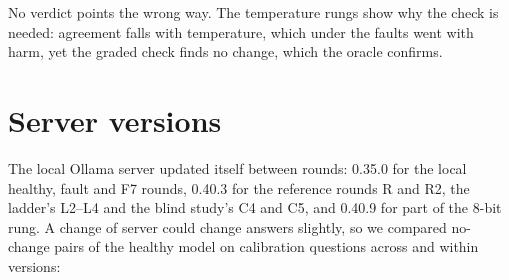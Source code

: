 \documentclass{article}
\begin{document}
\begin{center}\small
\setlength{\tabcolsep}{3pt}
\end{center}

\noindent No verdict points the wrong way. The temperature rungs show why the check
is needed: agreement falls with temperature, which under the faults went with harm,
yet the graded check finds no change, which the oracle confirms.

\section{Server versions}
\label{app:server}

The local Ollama server updated itself between rounds: 0.35.0 for the local
healthy, fault and F7 rounds, 0.40.3 for the reference rounds R and R2, the ladder's
L2--L4 and the blind study's C4 and C5, and 0.40.9 for part of the 8-bit rung. A
change of server could change answers slightly, so we compared no-change pairs of
the healthy model on calibration questions across and within versions:
\end{document}
